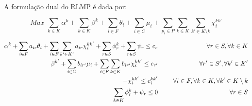 \documentclass[12pt]{article}
\begin{document}
\noindent A formula\c{c}\~ao dual do RLMP \'e dada por:

\[
Max \,\, \sum\limits_{k \in K}{\alpha^k} + \sum\limits_{k \in K}{\beta^k} + \sum\limits_{i \in F}{\theta_i} + \sum\limits_{i \in C}{\mu_i} + \sum\limits_{p_i \in P} { \sum\limits_{k \in K} { \sum\limits_{k' \in K \setminus k} { \chi^{kk'}_i } } }
\]

\begin{small}
\begin{eqnarray}
\label{eqC01}
  \alpha^k + \sum\limits_{i \in F}{a_{ir} \theta_i} + \sum\limits_{i \in F}{ \sum\limits_{k' \in K'} { a_{ir}\chi^{kk'}_i } } + \sum\limits_{r \in S}{\phi^k_r} + \sum\limits_{r \in S}{\psi_r} \le c_r & \hspace{5mm} & \forall r \in S, \forall k \in K \\
\label{eqC02}
  \beta^{k'} + \sum\limits_{i \in C}{b_{ir'} \mu_i} + \sum\limits_{i \in F}{ \sum\limits_{k \in K} { b_{ir'}\chi^{kk'}_i } } \le c_{r'} & \hspace{5mm} & \forall r' \in S', \forall k' \in K' \\
\label{eqC03}  
  -\chi^{kk'}_i \le c^{kk'}_i & \hspace{5mm} & \forall i \in F, \forall k \in K, \forall k' \in K \setminus k \\
\label{eqC04}
  \sum\limits_{k \in K}{\phi^k_r} + \psi_r \le 0 & \hspace{5mm} & \forall r \in S 
\end{eqnarray}
\end{small}
\end{document}
